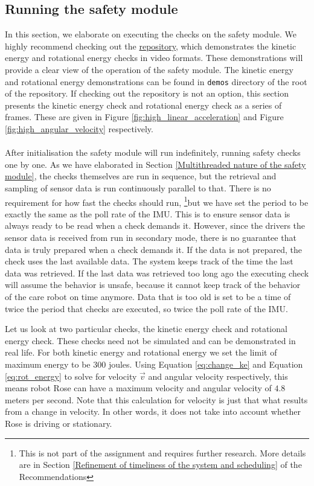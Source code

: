 \documentclass[12pt]{scrreprt}
\begin{document}
\subsection{Running the safety module}
\label{Running the safety module}
In this section, we elaborate on executing the checks on the safety module. We highly recommend checking out the \href{https://github.com/Yousousen/safety-module-for-care-robot-rose}{repository}, which demonstrates the kinetic energy and rotational energy checks in video formats. These demonstrations will provide a clear view of the operation of the safety module. The kinetic energy and rotational energy demonstrations can be found in \texttt{demos} directory of the root of the repository. If checking out the repository is not an option, this section presents the kinetic energy check and rotational energy check as a series of frames. These are given in Figure \ref{fig:high_linear_acceleration} and Figure \ref{fig:high_angular_velocity} respectively.
\\\\
After initialisation the safety module will run indefinitely, running safety checks one by one. As we have elaborated in Section \ref{Multithreaded nature of the safety module}, the checks themselves are run in sequence, but the retrieval and sampling of sensor data is run continuously parallel to that. There is no requirement for how fast the checks should run, \footnote{This is not part of the assignment and requires further research. More details are in Section \ref{Refinement of timeliness of the system and scheduling} of the Recommendations}but we have set the period to be exactly the same as the poll rate of the IMU. This is to ensure sensor data is always ready to be read when a check demands it. However, since the drivers the sensor data is received from run in secondary mode, there is no guarantee that data is truly prepared when a check demands it. If the data is not prepared, the check uses the last available data. The system keeps track of the time the last data was retrieved. If the last data was retrieved too long ago the executing check will assume the behavior is unsafe, because it cannot keep track of the behavior of the care robot on time anymore. Data that is too old is set to be a time of twice the period that checks are executed, so twice the poll rate of the IMU.
\par
Let us look at two particular checks, the kinetic energy check and rotational energy check. These checks need not be simulated and can be demonstrated in real life. For both kinetic energy and rotational energy we set the limit of maximum energy to be $300$ joules. Using Equation \ref{eq:change_ke} and Equation \ref{eq:rot_energy} to solve for velocity $\vec{v}$ and angular velocity respectively, this means robot Rose can have a maximum velocity and angular velocity of $4.8$ meters per second. Note that this calculation for velocity is just that what results from a change in velocity. In other words, it does not take into account whether Rose is driving or stationary.
\end{document}
